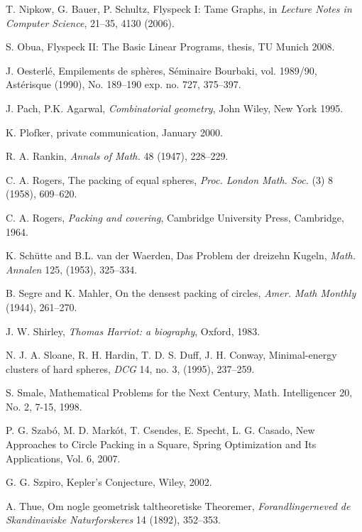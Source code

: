 \begin{thebibliography}{CHMS94}
  T. Nipkow, G. Bauer, P. Schultz, Flyspeck I: Tame Graphs, in
{\it Lecture Notes in Computer Science}, 21--35, 4130 (2006). 

  S. Obua, Flyspeck II: The Basic Linear Programs,
thesis, TU Munich 2008.

 J. Oesterl\'e,  Empilements de sph\`eres,
    S\'eminaire Bourbaki, vol. 1989/90, Ast\'erisque (1990),
        No. 189--190 exp. no. 727, 375--397.

 J. Pach, P.K. Agarwal, {\it Combinatorial geometry}, John Wiley,
    New York 1995.

  K. Plofker, private communication, January 2000.

 R. A. Rankin, {\it Annals of Math.} 48 (1947), 228--229.


 C. A. Rogers, The packing of equal spheres, {\it Proc. London Math.
    Soc.} (3) 8 (1958), 609--620.

 C. A. Rogers, {\it Packing and covering}, Cambridge University Press,
    Cambridge, 1964.

 K. Sch\"utte and B.L. van der Waerden, Das
Problem der dreizehn Kugeln, {\it Math. Annalen} 125, (1953),
325--334.

 B. Segre and K. Mahler, On the densest packing of
    circles, {\it Amer. Math Monthly} (1944), 261--270.

 J. W. Shirley,
{\it Thomas Harriot: a biography}, Oxford, 1983.

 N. J. A. Sloane, R. H. Hardin, T. D. S. Duff, J. H. Conway,
    Minimal-energy clusters of hard spheres,
    {\it DCG} 14,  no. 3, (1995), 237--259.

 S. Smale, 
   Mathematical Problems for the Next Century, Math. Intelligencer 20, No. 2, 7-15, 1998.
   
 P. G. Szab\'o, M. D. Mark\'ot, T. Csendes,
E. Specht, L. G. Casado, New Approaches to Circle Packing in a Square,
Spring Optimization and Its Applications, Vol. 6, 2007.

 G. G. Szpiro, Kepler's Conjecture, Wiley, 2002.

 A. Thue, Om nogle geometrisk taltheoretiske Theoremer,
    {\it Forandlingerneved de Skandinaviske Naturforskeres} 14 (1892), 352--353.


\end{thebibliography}
